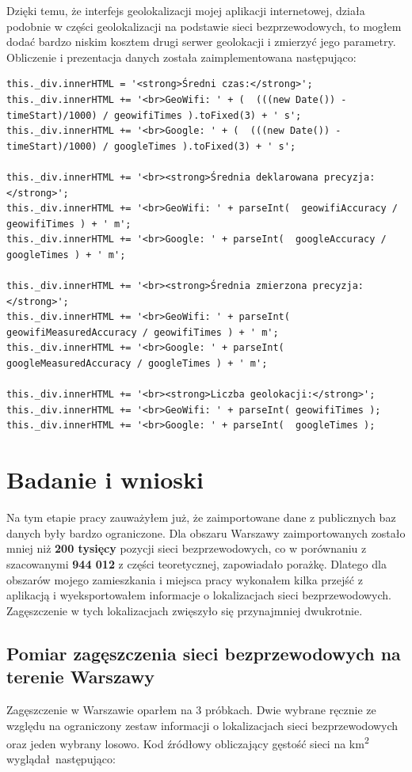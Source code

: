 Dzięki temu, że interfejs geolokalizacji mojej aplikacji internetowej, działa podobnie w części geolokalizacji na podstawie sieci bezprzewodowych, to mogłem dodać bardzo niskim kosztem drugi serwer geolokacji i zmierzyć jego parametry. Obliczenie i prezentacja danych została zaimplementowana następująco:
\begin{verbatim}
this._div.innerHTML = '<strong>Średni czas:</strong>';
this._div.innerHTML += '<br>GeoWifi: ' + (  (((new Date()) - timeStart)/1000) / geowifiTimes ).toFixed(3) + ' s';
this._div.innerHTML += '<br>Google: ' + (  (((new Date()) - timeStart)/1000) / googleTimes ).toFixed(3) + ' s';

this._div.innerHTML += '<br><strong>Średnia deklarowana precyzja:</strong>';
this._div.innerHTML += '<br>GeoWifi: ' + parseInt(  geowifiAccuracy / geowifiTimes ) + ' m';
this._div.innerHTML += '<br>Google: ' + parseInt(  googleAccuracy / googleTimes ) + ' m';

this._div.innerHTML += '<br><strong>Średnia zmierzona precyzja:</strong>';
this._div.innerHTML += '<br>GeoWifi: ' + parseInt(  geowifiMeasuredAccuracy / geowifiTimes ) + ' m';
this._div.innerHTML += '<br>Google: ' + parseInt(  googleMeasuredAccuracy / googleTimes ) + ' m';

this._div.innerHTML += '<br><strong>Liczba geolokacji:</strong>';
this._div.innerHTML += '<br>GeoWifi: ' + parseInt( geowifiTimes );
this._div.innerHTML += '<br>Google: ' + parseInt(  googleTimes );
\end{verbatim}


\section{Badanie i wnioski}
Na tym etapie pracy zauważyłem już, że zaimportowane dane z publicznych baz danych były bardzo ograniczone. Dla obszaru Warszawy zaimportowanych zostało mniej niż \textbf{200 tysięcy} pozycji sieci bezprzewodowych, co w porównaniu z szacowanymi \textbf{944 012} z części teoretycznej, zapowiadało porażkę. Dlatego dla obszarów mojego zamieszkania i miejsca pracy wykonałem kilka przejść z aplikacją i wyeksportowałem informacje o lokalizacjach sieci bezprzewodowych. Zagęszczenie w tych lokalizacjach zwięszyło się przynajmniej dwukrotnie.

\subsection{Pomiar zagęszczenia sieci bezprzewodowych na terenie Warszawy}
Zagęszczenie w Warszawie oparłem na 3 próbkach. Dwie wybrane ręcznie ze względu na ograniczony zestaw informacji o lokalizacjach sieci bezprzewodowych oraz jeden wybrany losowo. Kod źródłowy obliczający gęstość sieci na km\textsuperscript{2} wyglądał następująco:

